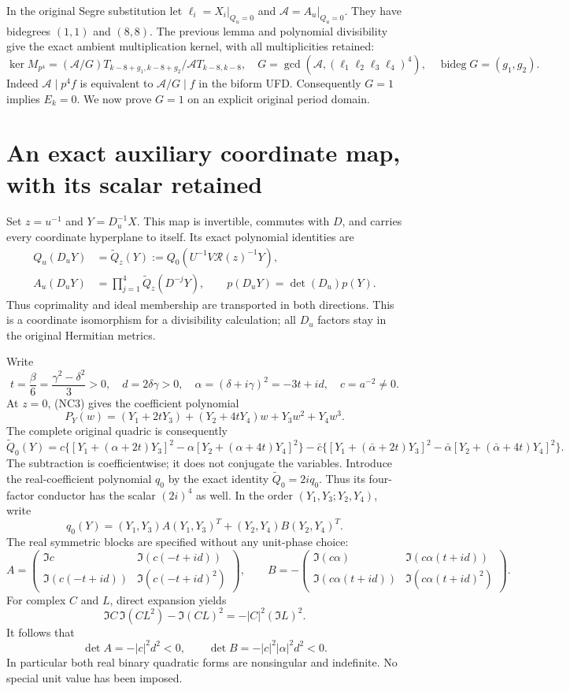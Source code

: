 \documentclass[11pt]{article}
\newcommand{\bdeg}{\operatorname{bideg}}
\begin{document}
In the original Segre substitution let $\ell_i=X_i|_{Q_u=0}$ and
$\mathcal A=A_u|_{Q_u=0}$. They have bidegrees $(1,1)$ and $(8,8)$.
The previous lemma and polynomial divisibility give the exact ambient
multiplication kernel, with all multiplicities retained:
\[
 \ker M_{p^4}=
 (\mathcal A/G)T_{k-8+g_1,k-8+g_2}/
                    \mathcal A T_{k-8,k-8},
 \quad G=\gcd(\mathcal A,(\ell_1\ell_2\ell_3\ell_4)^4),
 \quad\bdeg G=(g_1,g_2). \tag{NC8}
\]
Indeed $\mathcal A\mid p^4f$ is equivalent to
$\mathcal A/G\mid f$ in the biform UFD. Consequently $G=1$ implies
$E_k=0$. We now prove $G=1$ on an explicit original period domain.

\section{An exact auxiliary coordinate map, with its scalar retained}
Set $z=u^{-1}$ and $Y=D_u^{-1}X$. This map is invertible, commutes
with $D$, and carries every coordinate hyperplane to itself. Its exact
polynomial identities are
\[
 \begin{aligned}
 Q_u(D_uY)&=\widetilde Q_z(Y)
 :=Q_0(U^{-1}V\mathcal R(z)^{-1}Y),\\
 A_u(D_uY)&=\prod_{j=1}^4\widetilde Q_z(D^{-j}Y),
 \qquad p(D_uY)=\det(D_u)p(Y).
 \end{aligned}\tag{NC9}
\]
Thus coprimality and ideal membership are transported in both directions.
This is a coordinate isomorphism for a divisibility calculation; all
$D_u$ factors stay in the original Hermitian metrics.

Write
\[
 t=\frac{\beta}{6}=\frac{\gamma^2-\delta^2}{3}>0,
 \quad d=2\delta\gamma>0,
 \quad\alpha=(\delta+i\gamma)^2=-3t+id,
 \quad c=a^{-2}\ne0. \tag{NC10}
\]
At $z=0$, (NC3) gives the coefficient polynomial
\[
 P_Y(w)=(Y_1+2tY_3)+(Y_2+4tY_4)w+Y_3w^2+Y_4w^3.
 \tag{NC11}
\]
The complete original quadric is consequently
\[
 \widetilde Q_0(Y)=
 c\{[Y_1+(\alpha+2t)Y_3]^2
       -\alpha[Y_2+(\alpha+4t)Y_4]^2\}
 -\bar c\{[Y_1+(\bar\alpha+2t)Y_3]^2
       -\bar\alpha[Y_2+(\bar\alpha+4t)Y_4]^2\}.
 \tag{NC12}
\]
The subtraction is coefficientwise; it does not conjugate the variables.
Introduce the real-coefficient polynomial $q_0$ by the exact identity
$\widetilde Q_0=2i q_0$. Thus its four-factor conductor has the scalar
$(2i)^4$ as well. In the order $(Y_1,Y_3;Y_2,Y_4)$, write
\[
 q_0(Y)= (Y_1,Y_3)A(Y_1,Y_3)^T
             +(Y_2,Y_4)B(Y_2,Y_4)^T. \tag{NC13}
\]
The real symmetric blocks are specified without any unit-phase choice:
\[
 A=\begin{pmatrix}\Im c&\Im(c(-t+id))\\
 \Im(c(-t+id))&\Im(c(-t+id)^2)\end{pmatrix},\qquad
 B=-\begin{pmatrix}\Im(c\alpha)&\Im(c\alpha(t+id))\\
 \Im(c\alpha(t+id))&\Im(c\alpha(t+id)^2)\end{pmatrix}.
 \tag{NC14}
\]
For complex $C$ and $L$, direct expansion yields
\[
 \Im C\,\Im(CL^2)-\Im(CL)^2=-|C|^2(\Im L)^2.
\]
It follows that
\[
 \det A=-|c|^2d^2<0,\qquad
 \det B=-|c|^2|\alpha|^2d^2<0. \tag{NC15}
\]
In particular both real binary quadratic forms are nonsingular and
indefinite. No special unit value has been imposed.
\end{document}
